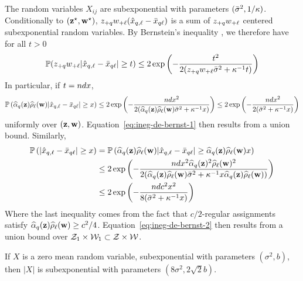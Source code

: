 The random variables $X_{ij}$ are subexponential with parameters $(\bar{\sigma}^2, 1/\kappa)$. Conditionally to $(\mathbf{z}^\star, \mathbf{w}^\star)$, $z_{+q} w_{+\ell}(\hat{x}_{q, \ell} - \bar{x}_{q\ell})$ is a sum of $z_{+q} w_{+\ell}$ centered subexponential random variables. By Bernstein's inequality \cite{massart2007concentration}, we therefore have for all $t > 0$
\begin{align*}
\Prob( \zsumk \wsuml | \hat{x}_{\kk, \el} - \barxkl| \geq t ) & \leq 2 \exp\left( - \frac{t^2}{2(\zsumk \wsuml\bar{\sigma}^2 + \neighborsize^{-1} t)}\right) \\
\end{align*}
In particular, if $t = nd x$,
\begin{align*}
\Prob\left( \pizk \rhowl | \hat{x}_{\kk, \el} - \barxkl| \geq x \right) & \leq 2 \exp\left( - \frac{ndx^2}{2(\pizk\rhowl\bar{\sigma}^2 + \neighborsize^{-1} x)}\right) \leq 2 \exp\left( - \frac{ndx^2}{2(\bar{\sigma}^2 + \neighborsize^{-1} x )}\right) \\
\end{align*}
uniformly over $(\mathbf{z}, \mathbf{w})$. Equation~\eqref{eq:ineg-de-bernst-1} then results from a union bound.
Similarly,
\begin{align*}
  \Prob\left( | \hat{x}_{\kk, \el} - \barxkl| \geq x \right) & = \Prob\left( \pizk \rhowl | \hat{x}_{\kk, \el} - \barxkl| \geq \pizk \rhowl x \right) \\
  & \leq 2 \exp\left( - \frac{ndx^2\pizk^2\rhowl^2}{2(\pizk\rhowl\bar{\sigma}^2 + \neighborsize^{-1} x \pizk\rhowl)}\right) \\
  & \leq 2 \exp\left( - \frac{ndc^2x^2}{8(\bar{\sigma}^2 + \neighborsize^{-1} x )}\right)
\end{align*}
Where the last inequality comes from the fact that $c/2$-regular assignments satisfy $\widehat{\alpha}_{q}(\mathbf{z}) \widehat{\rho}_{\ell}(\mathbf{w}) \geq c^2/4$. Equation~\eqref{eq:ineg-de-bernst-2} then results from a union bound over $\mathcal{Z}_1 \times \mathcal{W}_1 \subset \mathcal{Z} \times \mathcal{W}$.
\proofend

\begin{lemme}\label{lemme:absolutesubexponential}\textbf{}
If $X$ is a zero mean random variable, subexponential with parameters $(\sigma^2, b)$, then $|X|$ is subexponential with parameters $(8\sigma^2, 2\sqrt{2}b)$.
\end{lemme}

